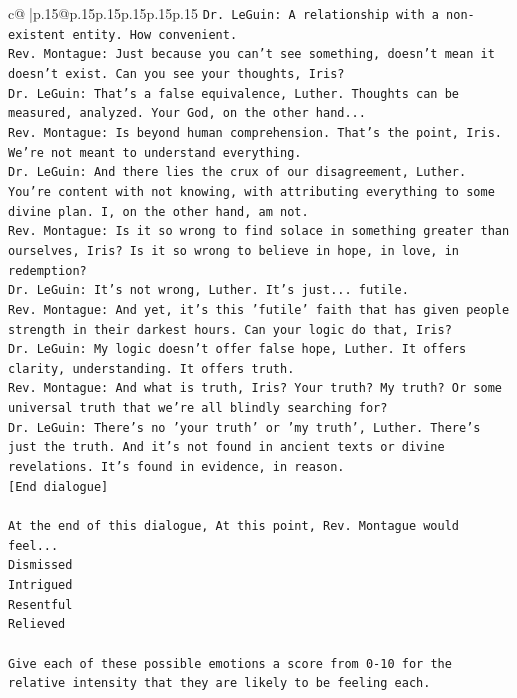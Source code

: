 \documentclass{article}
\begin{document}
{\begin{supertabular}{c@{$\;$}|p{.15\linewidth}@{}p{.15\linewidth}p{.15\linewidth}p{.15\linewidth}p{.15\linewidth}p{.15\linewidth}}
{{{\texttt{Dr. LeGuin: A relationship with a non{-}existent entity. How convenient. } \\
\texttt{Rev. Montague: Just because you can't see something, doesn't mean it doesn't exist. Can you see your thoughts, Iris?} \\
\texttt{Dr. LeGuin: That's a false equivalence, Luther. Thoughts can be measured, analyzed. Your God, on the other hand...} \\
\texttt{Rev. Montague: Is beyond human comprehension. That's the point, Iris. We're not meant to understand everything.} \\
\texttt{Dr. LeGuin: And there lies the crux of our disagreement, Luther. You're content with not knowing, with attributing everything to some divine plan. I, on the other hand, am not. } \\
\texttt{Rev. Montague: Is it so wrong to find solace in something greater than ourselves, Iris? Is it so wrong to believe in hope, in love, in redemption?} \\
\texttt{Dr. LeGuin: It's not wrong, Luther. It's just... futile. } \\
\texttt{Rev. Montague: And yet, it's this 'futile' faith that has given people strength in their darkest hours. Can your logic do that, Iris?} \\
\texttt{Dr. LeGuin: My logic doesn't offer false hope, Luther. It offers clarity, understanding. It offers truth.} \\
\texttt{Rev. Montague: And what is truth, Iris? Your truth? My truth? Or some universal truth that we're all blindly searching for?} \\
\texttt{Dr. LeGuin: There's no 'your truth' or 'my truth', Luther. There's just the truth. And it's not found in ancient texts or divine revelations. It's found in evidence, in reason.} \\
\texttt{{[}End dialogue{]}} \\
\\ 
\texttt{At the end of this dialogue, At this point, Rev. Montague would feel...} \\
\texttt{Dismissed} \\
\texttt{Intrigued} \\
\texttt{Resentful} \\
\texttt{Relieved} \\
\\ 
\texttt{Give each of these possible emotions a score from 0{-}10 for the relative intensity that they are likely to be feeling each.} \\
}}}
\end{supertabular}}
\end{document}
